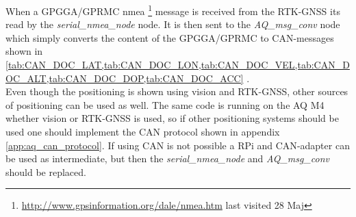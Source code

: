 When a GPGGA/GPRMC nmea \footnote{\url{http://www.gpsinformation.org/dale/nmea.htm} last visited 28 Maj} message is received from the \ac{RTK-GNSS} its read by the \textit{serial\_nmea\_node} node. It is then sent to the \textit{AQ\_msg\_conv} node which simply converts the content of the GPGGA/GPRMC to CAN-messages shown in \cref{tab:CAN_DOC_LAT,tab:CAN_DOC_LON,tab:CAN_DOC_VEL,tab:CAN_DOC_ALT,tab:CAN_DOC_DOP,tab:CAN_DOC_ACC}  . \\

Even though the positioning is shown using vision and \ac{RTK-GNSS}, other sources of positioning can be used as well. The same code is running on the \ac{AQ} M4 whether vision or \ac{RTK-GNSS} is used, so if other positioning systems should be used one should implement the \ac{CAN} protocol shown in appendix \ref{app:aq_can_protocol}.
If using \ac{CAN} is not possible a \ac{RPi} and \ac{CAN}-adapter can be used as intermediate, but then the \textit{serial\_nmea\_node} and \textit{AQ\_msg\_conv} should be replaced.
